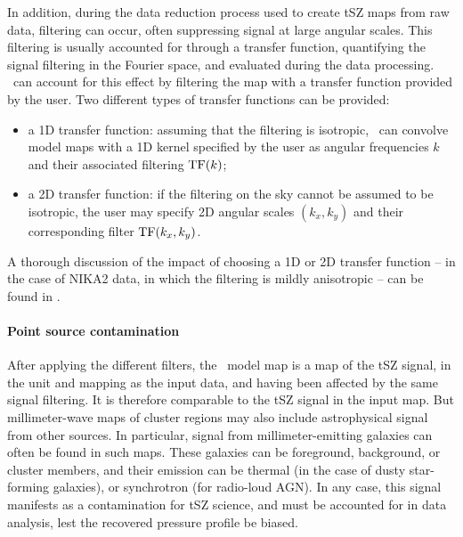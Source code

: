 In addition, during the data reduction process used to create tSZ maps from raw data, filtering can occur, often suppressing signal at large angular scales.
This filtering is usually accounted for through a transfer function, quantifying the signal filtering in the Fourier space, and evaluated during the data processing.
\panco\ can account for this effect by filtering the map with a transfer function provided by the user.
Two different types of transfer functions can be provided:
\begin{itemize}[leftmargin=*]
    \item a 1D transfer function: assuming that the filtering is isotropic, \panco\ can convolve model maps with a 1D kernel specified by the user as angular frequencies $k$ and their associated filtering ${\rm TF}(k)$;
    \item a 2D transfer function: if the filtering on the sky cannot be assumed to be isotropic, the user may specify 2D angular scales $(k_x, k_y)$ and their corresponding filter ${\rm TF}(k_x, k_y)$.
\end{itemize}
A thorough discussion of the impact of choosing a 1D or 2D transfer function -- in the case of NIKA2 data, in which the filtering is mildly anisotropic -- can be found in \citet{munoz-echeverria_multi-probe_2022}.

\paragraph{Point source contamination}

After applying the different filters, the \panco\ model map is a map of the tSZ signal, in the unit and mapping as the input data, and having been affected by the same signal filtering.
It is therefore comparable to the tSZ signal in the input map.
But millimeter-wave maps of cluster regions may also include astrophysical signal from other sources.
In particular, signal from millimeter-emitting galaxies can often be found in such maps.
These galaxies can be foreground, background, or cluster members, and their emission can be thermal (in the case of dusty star-forming galaxies), or synchrotron (for radio-loud AGN).
In any case, this signal manifests as a contamination for tSZ science, and must be accounted for in data analysis, lest the recovered pressure profile be biased.

